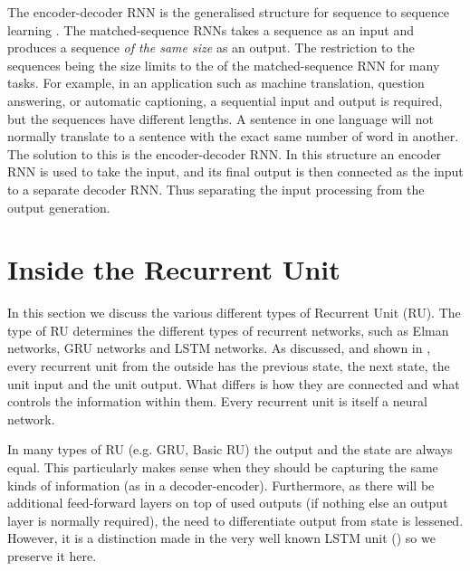 \documentclass[12pt,parskip]{komatufte}
\begin{document}
The encoder-decoder RNN is the generalised structure for sequence to sequence learning .
The matched-sequence RNNs takes a sequence as an input and produces a sequence \emph{of the same size} as an output.
The restriction to the sequences being the size limits to the of the matched-sequence RNN for many tasks.
For example, in an application such as machine translation, question answering, or automatic captioning, a sequential input and output is required, but the sequences have different lengths.
A sentence in one language will not normally translate to a sentence with the exact same number of word in another.
The solution to this is the encoder-decoder RNN.
In this structure an encoder RNN is used to take the input, and its final output is then connected as the input to a separate decoder RNN.
Thus separating the input processing from the output generation.





\section{Inside the Recurrent Unit}



In this section we discuss the various different types of Recurrent Unit (RU).
The type of RU determines the different types of recurrent networks, such as Elman networks, GRU networks and LSTM networks.
As discussed, and shown in , every recurrent unit from the outside has the previous state, the next state, the unit input and the unit output.
What differs is how they are connected and what controls the information within them.
Every recurrent unit is itself a neural network.

In many types of RU (e.g. GRU, Basic RU) the output and the state are always equal.
This particularly makes sense when they should be capturing the same kinds of information (as in a decoder-encoder).
Furthermore, as there will be additional feed-forward layers on top of used outputs (if nothing else an output layer is normally required), the need to differentiate output from state is lessened.
However, it is a distinction made in the very well known LSTM unit () so we preserve it here.
\end{document}
